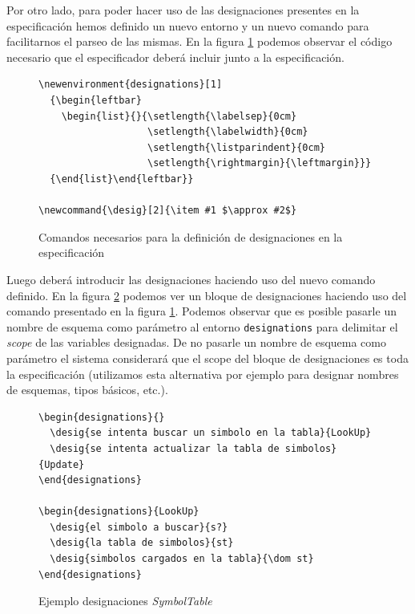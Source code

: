 Por otro lado, para poder hacer uso de las designaciones presentes en la especificación hemos definido un nuevo entorno y un nuevo comando para facilitarnos el parseo de las mismas. En la figura \ref{img:comandos_designaciones} podemos observar el código necesario que el especificador deberá incluir junto a la especificación.

\begin{figure}[H]
\centering
\begin{Verbatim}[frame=single,fontsize=\scriptsize]
\newenvironment{designations}[1]
  {\begin{leftbar}
    \begin{list}{}{\setlength{\labelsep}{0cm}
                   \setlength{\labelwidth}{0cm}
                   \setlength{\listparindent}{0cm}
                   \setlength{\rightmargin}{\leftmargin}}}
  {\end{list}\end{leftbar}}

\newcommand{\desig}[2]{\item #1 $\approx #2$}
\end{Verbatim}
\caption{Comandos necesarios para la definición de designaciones en la especificación}
\label{img:comandos_designaciones}
\end{figure}

Luego deberá introducir las designaciones haciendo uso del nuevo comando definido. En la figura \ref{ej:comandos_designaciones} podemos ver un bloque de designaciones haciendo uso del comando presentado en la figura \ref{img:comandos_designaciones}. Podemos observar que es posible pasarle un nombre de esquema como parámetro al entorno \texttt{designations} para delimitar el \textit{scope} de las variables designadas. De no pasarle un nombre de esquema como parámetro el sistema considerará que el scope del bloque de designaciones es toda la especificación (utilizamos esta alternativa por ejemplo para designar nombres de esquemas, tipos básicos, etc.).

\begin{figure}[H]
\centering
\begin{Verbatim}[frame=single,fontsize=\scriptsize]
\begin{designations}{}
  \desig{se intenta buscar un simbolo en la tabla}{LookUp}
  \desig{se intenta actualizar la tabla de simbolos}{Update}
\end{designations}

\begin{designations}{LookUp}
  \desig{el simbolo a buscar}{s?}
  \desig{la tabla de simbolos}{st}
  \desig{simbolos cargados en la tabla}{\dom st}
\end{designations}
\end{Verbatim}
\caption{Ejemplo designaciones \textit{SymbolTable}}
\label{ej:comandos_designaciones}
\end{figure}

